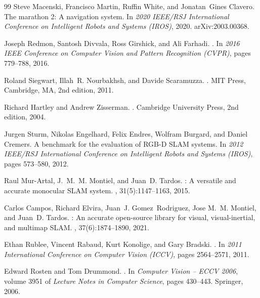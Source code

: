 \documentclass[10pt]{article}
\begin{document}
\begin{thebibliography}{99}
Steve Macenski, Francisco Martin, Ruffin White, and Jonatan~Gines Clavero.
\newblock The marathon 2: A navigation system.
\newblock In {\em 2020 IEEE/RSJ International Conference on Intelligent Robots
  and Systems (IROS)}, 2020.
\newblock arXiv:2003.00368.

Joseph Redmon, Santosh Divvala, Ross Girshick, and Ali Farhadi.
.
\newblock In {\em 2016 IEEE Conference on Computer Vision and Pattern
  Recognition (CVPR)}, pages 779--788, 2016.

Roland Siegwart, Illah~R. Nourbakhsh, and Davide Scaramuzza.
.
\newblock MIT Press, Cambridge, MA, 2nd edition, 2011.

Richard Hartley and Andrew Zisserman.
.
\newblock Cambridge University Press, 2nd edition, 2004.

Jurgen Sturm, Nikolas Engelhard, Felix Endres, Wolfram Burgard, and Daniel
  Cremers.
\newblock A benchmark for the evaluation of {RGB-D} {SLAM} systems.
\newblock In {\em 2012 IEEE/RSJ International Conference on Intelligent Robots
  and Systems (IROS)}, pages 573--580, 2012.

Raul Mur-Artal, J.~M.~M. Montiel, and Juan~D. Tardos.
: A versatile and accurate monocular {SLAM} system.
, 31(5):1147--1163, 2015.

Carlos Campos, Richard Elvira, Juan~J. Gomez~Rodriguez, Jose M.~M. Montiel, and
  Juan~D. Tardos.
: An accurate open-source library for visual,
  visual-inertial, and multimap {SLAM}.
, 37(6):1874--1890, 2021.

Ethan Rublee, Vincent Rabaud, Kurt Konolige, and Gary Bradski.
.
\newblock In {\em 2011 International Conference on Computer Vision (ICCV)},
  pages 2564--2571, 2011.

Edward Rosten and Tom Drummond.
.
\newblock In {\em Computer Vision -- ECCV 2006}, volume 3951 of {\em Lecture
  Notes in Computer Science}, pages 430--443. Springer, 2006.


\end{thebibliography}
\end{document}
